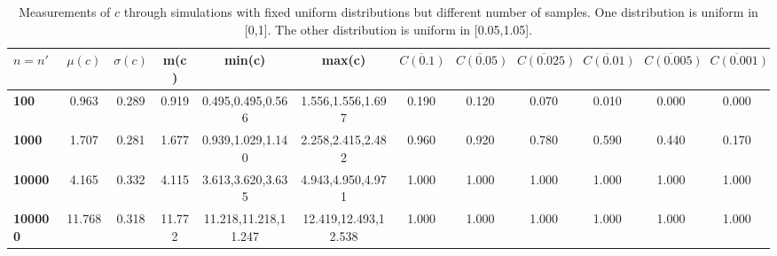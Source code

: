 \begin{table*}[h!]
\begin{center}
\begin{tabular}{| l | c | c | c | c | c | c | c | c | c | c | c |}\hline
$n=n'$ & $\mu(c)$ & $\sigma(c)$ & m(c) & min(c) & max(c) & $\overline{C(0.1)}$ & $\overline{C(0.05)}$ & $\overline{C(0.025)}$ & $\overline{C(0.01)}$ & $\overline{C(0.005)}$ & $\overline{C(0.001)}$ \\\hline\hline
{\bf 100} & 0.963 & 0.289 & 0.919 & 0.495,0.495,0.566 & 1.556,1.556,1.697 & 0.190 & 0.120 & 0.070 & 0.010 & 0.000 & 0.000 \\\hline
{\bf 1000} & 1.707 & 0.281 & 1.677 & 0.939,1.029,1.140 & 2.258,2.415,2.482 & 0.960 & 0.920 & 0.780 & 0.590 & 0.440 & 0.170 \\\hline
{\bf 10000} & 4.165 & 0.332 & 4.115 & 3.613,3.620,3.635 & 4.943,4.950,4.971 & 1.000 & 1.000 & 1.000 & 1.000 & 1.000 & 1.000 \\\hline
{\bf 100000} & 11.768 & 0.318 & 11.772 & 11.218,11.218,11.247 & 12.419,12.493,12.538 & 1.000 & 1.000 & 1.000 & 1.000 & 1.000 & 1.000 \\\hline
\end{tabular}
\caption{Measurements of $c$ through simulations
        with fixed uniform distributions but different number of samples.
        One distribution is uniform in [0,1].
        The other distribution is uniform in [0.05,1.05].}
\end{center}
\end{table*}